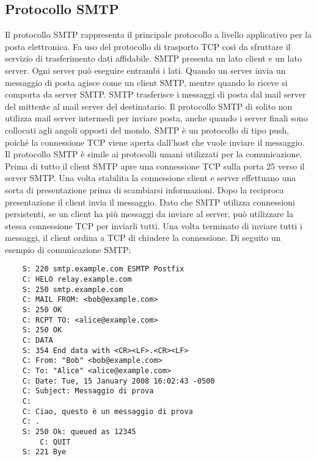 \subsection{Protocollo SMTP}
Il protocollo SMTP rappresenta il principale protocollo a livello applicativo per la posta elettronica. 
Fa uso del protocollo di trasporto TCP così da sfruttare il servizio di trasferimento dati affidabile. 
SMTP presenta un lato client e un lato server. Ogni server può eseguire entrambi i lati. 
Quando un server invia un messaggio di posta agisce come un client SMTP, mentre quando lo riceve si comporta 
da server SMTP.
SMTP trasferisce i messaggi di posta dal mail server del mittente al mail server del destinatario. 
Il protocollo SMTP di solito non utilizza mail server intermedi per inviare posta, anche quando i server finali 
sono collocati agli angoli opposti del mondo.
SMTP è un protocollo di tipo push, poiché la connessione TCP viene aperta dall’host che vuole inviare il messaggio. 
Il protocollo SMTP è simile ai protocolli umani utilizzati per la comunicazione. 
Prima di tutto il client SMTP apre una connessione TCP sulla porta 25 verso il server SMTP. 
Una volta stabilita la connessione client e server effettuano una sorta di presentazione prima di scambiarsi 
informazioni. Dopo la reciproca presentazione il client invia il messaggio.
Dato che SMTP utilizza connessioni persistenti, se un client ha più messaggi da inviare al server, 
può utilizzare la stessa connessione TCP per inviarli tutti. Una volta terminato di inviare tutti i messaggi, 
il client ordina a TCP di chiudere la connessione.
Di seguito un esempio di comunicazione SMTP:\cite{SMTP}

\begin{verbatim}
    S: 220 smtp.example.com ESMTP Postfix
    C: HELO relay.example.com
    S: 250 smtp.example.com
    C: MAIL FROM: <bob@example.com>
    S: 250 OK
    C: RCPT TO: <alice@example.com>
    S: 250 OK
    C: DATA
    S: 354 End data with <CR><LF>.<CR><LF>
    C: From: "Bob" <bob@example.com>
    C: To: "Alice" <alice@example.com>
    C: Date: Tue, 15 January 2008 16:02:43 -0500
    C: Subject: Messaggio di prova
    C: 
    C: Ciao, questo è un messaggio di prova
    C: .
    S: 250 Ok: queued as 12345
        C: QUIT
    S: 221 Bye
\end{verbatim}

